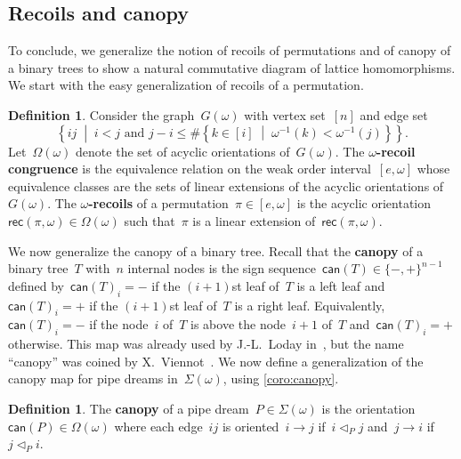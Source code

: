 \documentclass[reqno]{amsart}
\theoremstyle{definition}
\newtheorem{definition}[theorem]{Definition}
\newcommand{\set}[2]{\left\{ #1 \;\middle|\; #2 \right\}} %
\newcommand{\defn}[1]{\textbf{\textsf{\color{PineGreen} #1}}} %
\newcommand{\acyclicPipeDreams}{\Sigma} %
\newcommand{\acyclicOrientations}{\Omega} %
\newcommand{\recoils}[2]{\mathsf{rec}(#1,#2)} %
\newcommand{\canopy}[1]{\mathsf{can}(#1)} %
\newcommand{\less}{\vartriangleleft} %
\newcommand{\contactLess}[1]{\less_{#1}} %
\begin{document}

\subsection{Recoils and canopy}
\label{subsec:canopy}

To conclude, we generalize the notion of recoils of permutations and of canopy of a binary trees to show a natural commutative diagram of lattice homomorphisms.
We start with the easy generalization of recoils of a permutation.

\begin{definition}
\label{def:recoils}
Consider the graph~$G(\omega)$ with vertex set~$[n]$ and edge set
\[
\set{ij}{i < j \text{ and } j-i \le \#\set{k \in [i]}{\omega^{-1}(k) < \omega^{-1}(j)}}.
\]
Let~$\acyclicOrientations(\omega)$ denote the set of acyclic orientations of~$G(\omega)$.
The \defn{$\omega$-recoil congruence} is the equivalence relation on the weak order interval~$[e, \omega]$ whose equivalence classes are the sets of linear extensions of the acyclic orientations of~$G(\omega)$.
The \defn{$\omega$-recoils} of a permutation~$\pi \in [e,\omega]$ is the acyclic orientation~${\recoils{\pi}{\omega} \in \acyclicOrientations(\omega)}$ such that~$\pi$ is a linear extension of~$\recoils{\pi}{\omega}$.
\end{definition}

We now generalize the canopy of a binary tree.
Recall that the \defn{canopy} of a binary tree~$T$ with~$n$ internal nodes is the sign sequence~${\canopy{T} \in \{{-},{+}\}^{n-1}}$ defined by~$\canopy{T}_i = {-}$ if the $(i+1)$st leaf of~$T$ is a left leaf and~$\canopy{T}_i = {+}$ if the $(i+1)$st leaf of~$T$ is a right leaf.
Equivalently, $\canopy{T}_i = -$ if the node~$i$ of~$T$ is above the node~$i+1$ of~$T$ and~$\canopy{T}_i = +$ otherwise.
This map was already used by J.-L.~Loday in~\cite{LodayRonco, Loday}, but the name ``canopy'' was coined by X.~Viennot~\cite{Viennot}.
We now define a generalization of the canopy map for pipe dreams in~$\acyclicPipeDreams(\omega)$, using \cref{coro:canopy}.

\begin{definition}
\label{def:canopy}
The \defn{canopy} of a pipe dream~$P \in \acyclicPipeDreams(\omega)$ is the orientation~$\canopy{P} \in \acyclicOrientations(\omega)$ where each edge~$ij$ is oriented~$i \to j$ if~$i \contactLess{P} j$ and~$j \to i$ if~$j \contactLess{P} i$.
\end{definition}
\end{document}
